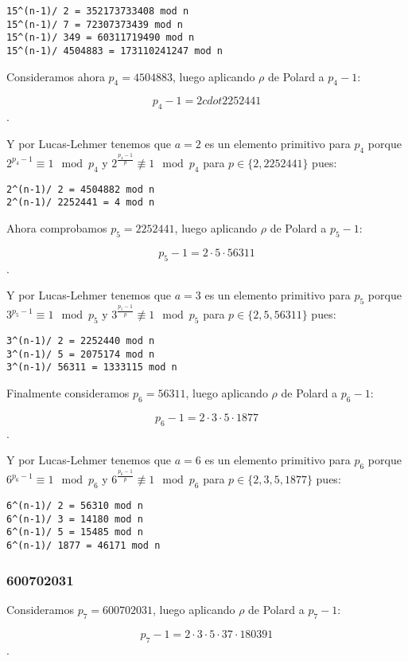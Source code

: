 \documentclass[a4paper]{article}
\begin{document}
\begin{verbatim}
15^(n-1)/ 2 = 352173733408 mod n
15^(n-1)/ 7 = 72307373439 mod n
15^(n-1)/ 349 = 60311719490 mod n
15^(n-1)/ 4504883 = 173110241247 mod n
\end{verbatim}

Consideramos ahora $p_4=4504883$, luego aplicando $\rho$ de Polard a $p_4-1$:

$$p_4-1=2 cdot 2252441$$.

Y por Lucas-Lehmer tenemos que $a=2$ es un elemento primitivo para $p_4$ porque $2^{p_4-1}\equiv 1\mod p_4$ y $2^{\frac{p_4-1}{p}}\not\equiv 1\mod p_4 $ para $p\in\{2, 2252441\}$ pues:

\begin{verbatim}
2^(n-1)/ 2 = 4504882 mod n
2^(n-1)/ 2252441 = 4 mod n
\end{verbatim}

Ahora comprobamos $p_5=2252441$, luego aplicando $\rho$ de Polard a $p_5-1$:

$$p_5-1=2 \cdot 5\cdot 56311$$.

Y por Lucas-Lehmer tenemos que $a=3$ es un elemento primitivo para $p_5$ porque $3^{p_5-1}\equiv 1\mod p_5$ y $3^{\frac{p_5-1}{p}}\not\equiv 1\mod p_5 $ para $p\in\{2, 5, 56311\}$ pues:

\begin{verbatim}
3^(n-1)/ 2 = 2252440 mod n
3^(n-1)/ 5 = 2075174 mod n
3^(n-1)/ 56311 = 1333115 mod n
\end{verbatim}

Finalmente consideramos $p_6=56311$, luego aplicando $\rho$ de Polard a $p_6-1$:

$$p_6-1=2 \cdot 3\cdot 5\cdot 1877$$.

Y por Lucas-Lehmer tenemos que $a=6$ es un elemento primitivo para $p_6$ porque $6^{p_6-1}\equiv 1\mod p_6$ y $6^{\frac{p_6-1}{p}}\not\equiv 1\mod p_6 $ para $p\in\{2, 3,5,1877\}$ pues:

\begin{verbatim}
6^(n-1)/ 2 = 56310 mod n
6^(n-1)/ 3 = 14180 mod n
6^(n-1)/ 5 = 15485 mod n
6^(n-1)/ 1877 = 46171 mod n
\end{verbatim}

\subsubsection{600702031}

Consideramos $p_7=600702031$, luego aplicando $\rho$ de Polard a $p_7-1$:

$$p_7-1=2 \cdot 3\cdot 5\cdot 37\cdot 180391$$.
\end{document}
